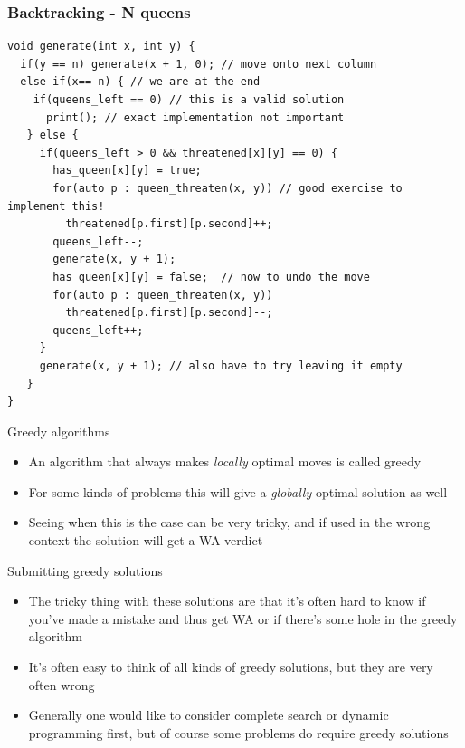 \documentclass{beamer}
\begin{document}
\begin{frame}
	\frametitle{Backtracking - N queens}
	\begin{scriptsize}
	\begin{verbatim}
void generate(int x, int y) {
  if(y == n) generate(x + 1, 0); // move onto next column
  else if(x== n) { // we are at the end
    if(queens_left == 0) // this is a valid solution
      print(); // exact implementation not important
   } else {
     if(queens_left > 0 && threatened[x][y] == 0) {
       has_queen[x][y] = true;
       for(auto p : queen_threaten(x, y)) // good exercise to implement this!
         threatened[p.first][p.second]++; 
       queens_left--;
       generate(x, y + 1);
       has_queen[x][y] = false;  // now to undo the move
       for(auto p : queen_threaten(x, y))
         threatened[p.first][p.second]--; 
       queens_left++;
     }
     generate(x, y + 1); // also have to try leaving it empty
   }
}
	\end{verbatim}
	\end{scriptsize}
\end{frame}


\begin{frame}[plain]{Greedy algorithms}
    \begin{itemize}
        \item An algorithm that always makes \textit{locally} optimal moves is called greedy
        \item For some kinds of problems this will give a \textit{globally} optimal solution as well
        \item Seeing when this is the case can be very tricky, and if used in the wrong context the solution will get a WA verdict
    \end{itemize}
\end{frame}

\begin{frame}[plain]{Submitting greedy solutions}
    \begin{itemize}
        \item The tricky thing with these solutions are that it's often hard to know if you've made a mistake and thus get WA or if there's some hole in the greedy algorithm
        \item It's often easy to think of all kinds of greedy solutions, but they are very often wrong
        \item Generally one would like to consider complete search or dynamic programming first, but of course some problems do require greedy solutions
    \end{itemize}
\end{frame}
\end{document}
